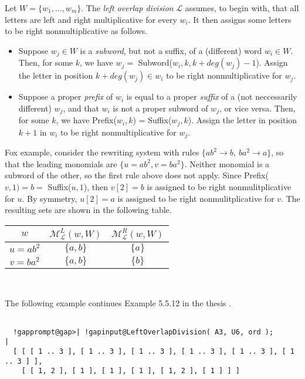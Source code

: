 \documentclass[a4paper,11pt]{report}
\begin{document}
{{{ Let $W = \{w_1, \ldots, w_m\}$. The \emph{left overlap division} $\mathcal{L}$ assumes, to begin with, that all letters are left and right multiplicative for
every $w_i$. It then assigns some letters to be right nonmultiplicative as follows. 
\begin{itemize}
\item  Suppose $w_j \in W$ is a \emph{subword}, but not a suffix, of a (different) word $w_i \in W$. Then, for some $k$, we have $w_j =$ Subword($w_i,k,k+deg(w_j)-1$). Assign the letter in position $k+deg(w_j) \in w_i$ to be right nonmultiplicative for $w_j$. 
\item  Suppose a proper \emph{prefix} of $w_i$ is equal to a proper \emph{suffix} of a (not neccessarily different) $w_j$, and that $w_i$ is not a proper subword of $w_j$, or vice versa. Then, for some $k$, we have Prefix($w_i,k$) = Suffix($w_j,k$). Assign the letter in position $k+1$ in $w_i$ to be right nonmultiplicative for $w_j$. 
\end{itemize}
 Fox example, consider the rewriting system with rules $\{ab^2 \to b,~ ba^2 \to a\}$, so that the leading monomials are $\{u=ab^2, v=ba^2\}$. Neither monomial is a subword of the other, so the first rule above does not
apply. Since Prefix($v,1) = b =$ Suffix($u,1$), then $v[2]=b$ is assigned to be right nonmulitplicative for $u$. By symmetry, $u[2]=a$ is assigned to be right nonmulitplicative for $v$. The resulting sets are shown in the following table. \begin{center}
\begin{tabular}{|c|c|c|}\hline
$w$&
$\mathcal{M}^L_{\mathcal{L}}(w,W)$&
$\mathcal{M}^R_{\mathcal{L}}(w,W)$\\
\hline
$u = ab^2$&
$\{a,b\}$&
$\{a\}$\\
$v = ba^2$&
$\{a,b\}$&
$\{b\}$\\
\hline
\end{tabular}\\[2mm]
\end{center}

 }

 

 The following example continues Example 5.5.12 in the thesis \cite{gareth-thesis}. 
\begin{Verbatim}[commandchars=!@|,fontsize=\small,frame=single,label=Example]
  
  !gapprompt@gap>| !gapinput@LeftOverlapDivision( A3, U6, ord );               |
  [ [ [ 1 .. 3 ], [ 1 .. 3 ], [ 1 .. 3 ], [ 1 .. 3 ], [ 1 .. 3 ], [ 1 .. 3 ] ], 
    [ [ 1, 2 ], [ 1 ], [ 1 ], [ 1 ], [ 1, 2 ], [ 1 ] ] ]
  

\end{Verbatim}}}
\end{document}
